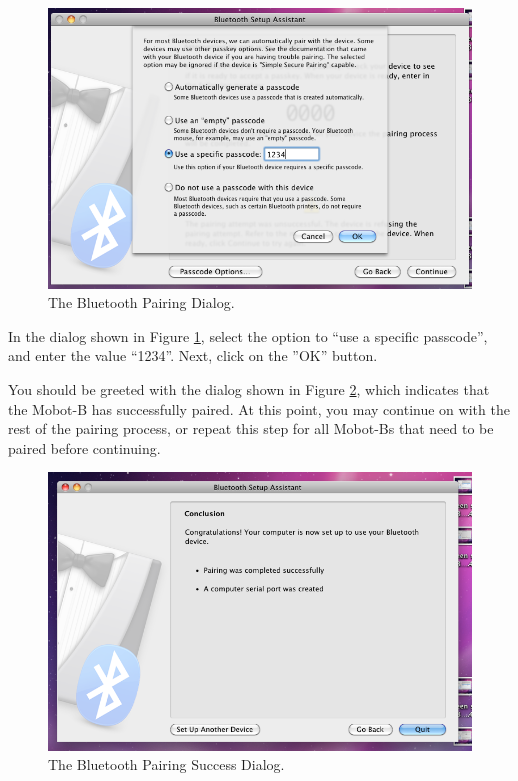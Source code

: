 \documentclass{article}
\begin{document}
\begin{figure}[H]
\begin{center}
\includegraphics[width=5in]{images/mac_pairing5.png}
\end{center}
\caption{\label{fig:mac_pairing5} The Bluetooth Pairing Dialog.}
\end{figure}

In the dialog shown in Figure \ref{fig:mac_pairing5}, select the option to 
``use a specific passcode'', and enter the value ``1234''. Next, 
click on the ''OK'' button.

You should be greeted with the dialog shown in Figure \ref{fig:mac_pairing6}, which indicates that the Mobot-B
has successfully paired. At this point, you may continue on with the rest of the pairing process, or 
repeat this step for all Mobot-Bs that need to be paired before continuing.

\begin{figure}[H]
\begin{center}
\includegraphics[width=5in]{images/mac_pairing6.png}
\end{center}
\caption{\label{fig:mac_pairing6} The Bluetooth Pairing Success Dialog.}
\end{figure}
\end{document}
